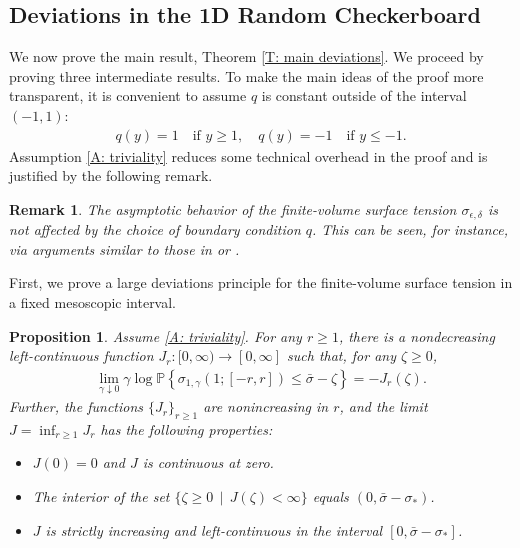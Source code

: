 \documentclass[10pt,a4paper]{amsart}
\newtheorem{prop}{Proposition}
\newtheorem{remark}{Remark}
\begin{document}

\subsection{Deviations in the 1D Random Checkerboard} \label{S: overview large deviations} We now prove the main result, Theorem \ref{T: main deviations}.  We proceed by proving three intermediate results.
To make the main ideas of the proof more transparent, it is convenient to assume $q$ is constant outside of the interval $(-1,1)$:
	\begin{align} \label{A: triviality}
		q( y ) = 1 \quad \text{if} \, \, y \geq 1, \quad q(y) = -1 \quad \text{if} \, \, y \leq -1.
	\end{align}
Assumption \eqref{A: triviality} reduces some technical overhead in the proof and is justified by the following remark. 
		
		\begin{remark}\label{rmk: triviality} The asymptotic behavior of the finite-volume surface tension $\sigma_{\epsilon,\delta}$ is not affected by the choice of boundary condition $q$.  This can be seen, for instance, via arguments similar to those in \cite[Theorem 3.7]{ansini_braides_chiado-piat} or \cite[Proposition 10]{morfe}. 
		\end{remark}
        
First, we prove a large deviations principle for the finite-volume surface tension in a fixed mesoscopic interval.

	\begin{prop} \label{P: large deviations} Assume \eqref{A: triviality}.  For any $r \geq 1$, there is a nondecreasing left-continuous function $J_{r} : [0,\infty) \to [0,\infty]$ such that, for any $\zeta \geq 0$, 
		\begin{align}\label{eqn:ldp-principle-r}
				\lim_{ \gamma \downarrow 0 } \gamma \log \mathbb{P} \left\{ \sigma_{ 1, \gamma } ( 1 ; [-r,r] ) \leq \bar{\sigma} - \zeta \right\} = -J_{r}(\zeta).
		\end{align}
	Further, the functions $\{J_{r}\}_{r \geq 1}$ are nonincreasing in $r$, and the limit $J = \inf_{r \geq 1} J_{r}$ has the following properties:
		\begin{itemize}
			\item[(i)] $J(0) = 0$ and $J$ is continuous at zero.
			\item[(ii)] The interior of the set $\{ \zeta \geq 0 \, \mid \, J(\zeta) < \infty \}$ equals $(0,\bar{\sigma} - \sigma_{*})$.
			\item[(iii)] $J$ is strictly increasing and left-continuous in the interval $[0,\bar{\sigma} - \sigma_{*}]$. 		
		\end{itemize}  
	\end{prop}
\end{document}
